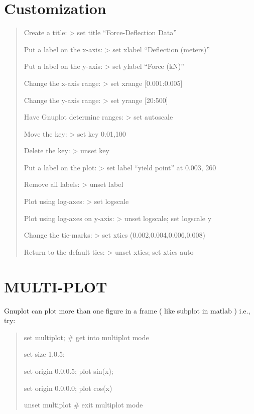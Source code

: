 \documentclass[letterpaper,10pt,english]{sphinxmanual}
\begin{document}
\section{Customization}
\label{appendix:customization}\begin{quote}

Create a title:                  \textgreater{} set title ``Force-Deflection Data''

Put a label on the x-axis:       \textgreater{} set xlabel ``Deflection (meters)''

Put a label on the y-axis:       \textgreater{} set ylabel ``Force (kN)''

Change the x-axis range:         \textgreater{} set xrange {[}0.001:0.005{]}

Change the y-axis range:         \textgreater{} set yrange {[}20:500{]}

Have Gnuplot determine ranges:   \textgreater{} set autoscale

Move the key:                    \textgreater{} set key 0.01,100

Delete the key:                  \textgreater{} unset key

Put a label on the plot:         \textgreater{} set label ``yield point'' at 0.003, 260

Remove all labels:               \textgreater{} unset label

Plot using log-axes:             \textgreater{} set logscale

Plot using log-axes on y-axis:   \textgreater{} unset logscale; set logscale y

Change the tic-marks:            \textgreater{} set xtics (0.002,0.004,0.006,0.008)

Return to the default tics:      \textgreater{} unset xtics; set xtics auto
\end{quote}


\section{MULTI-PLOT}
\label{appendix:multi-plot}
Gnuplot can plot more than one figure in a frame ( like subplot in matlab ) i.e., try:
\begin{quote}

set multiplot;                  \# get into multiplot mode

set size 1,0.5;

set origin 0.0,0.5;   plot sin(x);

set origin 0.0,0.0;   plot cos(x)

unset multiplot                         \# exit multiplot mode
\end{quote}
\end{document}
